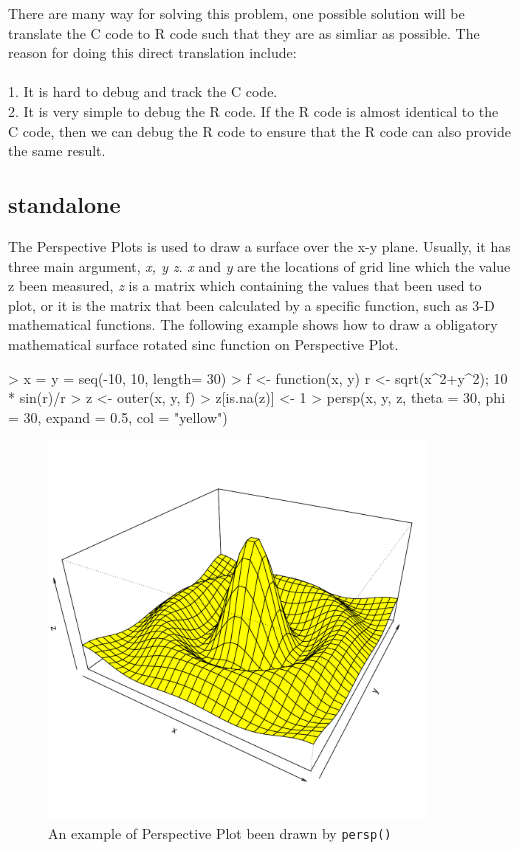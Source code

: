 \documentclass[a4paper,10pt]{article}
\begin{document}
There are many way for solving this problem, one possible solution will be translate the C code to R code such that they are as simliar as possible. The reason for doing this direct translation include: \\\\
1. It is hard to debug and track the C code. \\
2. It is very simple to debug the R code. If the R code is almost identical to the C code, then we can debug the R code to ensure that the R code can also provide the same result. \\

\subsection{standalone}
The Perspective Plots is used to draw a surface over the x-y plane. Usually, it has three main argument, \emph{x, y z}. \emph{x} and \emph{y} are the locations of grid line which the value z been measured, \emph{z} is a matrix which containing the values that been used to plot, or it is the matrix that been calculated by a specific function, such as 3-D mathematical functions. The following example shows how to draw a obligatory mathematical surface rotated sinc function on Perspective Plot.


\begin{Schunk}
\begin{Sinput}
> x = y = seq(-10, 10, length= 30)
> f <- function(x, y) { r <- sqrt(x^2+y^2); 10 * sin(r)/r }
> z <- outer(x, y, f)
> z[is.na(z)] <- 1
> persp(x, y, z, theta = 30, phi = 30, expand = 0.5, col = "yellow")
\end{Sinput}
\end{Schunk}



\begin{figure}[h]
\begin{center}
  \includegraphics[height = 10cm, width = 10cm]{figure/standalone_1}
  \caption{An example of Perspective Plot been drawn by \texttt{persp()}}
  	\label{figure4}
\end{center}
\end{figure}
\end{document}
